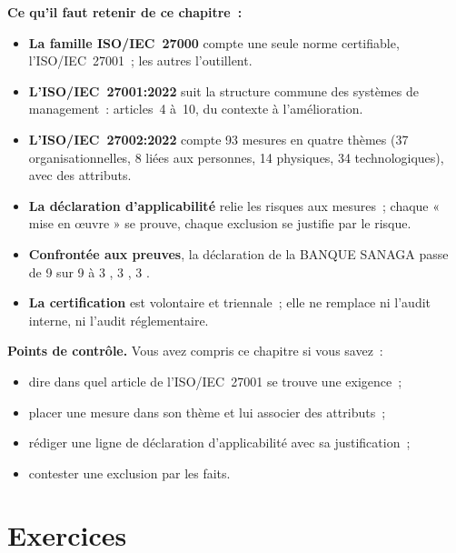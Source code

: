 \separateur

\begin{boxresume}
\textbf{Ce qu'il faut retenir de ce chapitre~:}
\begin{itemize}
    \item \textbf{La famille ISO/IEC~27000} compte une seule norme
          certifiable, l'ISO/IEC~27001~; les autres l'outillent.
    \item \textbf{L'ISO/IEC~27001:2022} suit la structure commune des
          systèmes de management~: articles~4 à~10, du contexte à
          l'amélioration.
    \item \textbf{L'ISO/IEC~27002:2022} compte 93 mesures en quatre thèmes
          (37 organisationnelles, 8 liées aux personnes, 14 physiques, 34
          technologiques), avec des attributs.
    \item \textbf{La déclaration d'applicabilité} relie les risques aux
          mesures~; chaque « mise en œuvre » se prouve, chaque exclusion se
          justifie par le risque.
    \item \textbf{Confrontée aux preuves}, la déclaration de la BANQUE
          SANAGA passe de 9 sur 9 à 3 \OUI{}, 3 \NON{}, 3 \NEK{}.
    \item \textbf{La certification} est volontaire et triennale~; elle ne
          remplace ni l'audit interne, ni l'audit réglementaire.
\end{itemize}
\end{boxresume}

\begin{boxinfo}
\textbf{Points de contrôle.} Vous avez compris ce chapitre si vous savez~:
\begin{itemize}
    \item dire dans quel article de l'ISO/IEC~27001 se trouve une exigence~;
    \item placer une mesure dans son thème et lui associer des attributs~;
    \item rédiger une ligne de déclaration d'applicabilité avec sa
          justification~;
    \item contester une exclusion par les faits.
\end{itemize}
\end{boxinfo}

\section*{Exercices}

